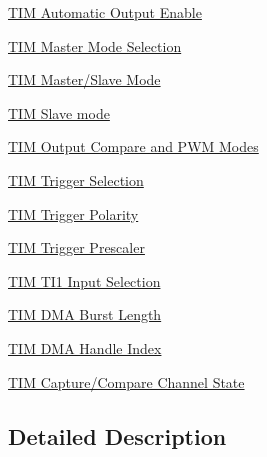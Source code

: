 \begin{DoxyCompactItemize}
\hyperlink{group___t_i_m___a_o_e___bit___set___reset}{T\+I\+M Automatic Output Enable}
\item 
\hyperlink{group___t_i_m___master___mode___selection}{T\+I\+M Master Mode Selection}
\item 
\hyperlink{group___t_i_m___master___slave___mode}{T\+I\+M Master/\+Slave Mode}
\item 
\hyperlink{group___t_i_m___slave___mode}{T\+I\+M Slave mode}
\item 
\hyperlink{group___t_i_m___output___compare__and___p_w_m__modes}{T\+I\+M Output Compare and P\+W\+M Modes}
\item 
\hyperlink{group___t_i_m___trigger___selection}{T\+I\+M Trigger Selection}
\item 
\hyperlink{group___t_i_m___trigger___polarity}{T\+I\+M Trigger Polarity}
\item 
\hyperlink{group___t_i_m___trigger___prescaler}{T\+I\+M Trigger Prescaler}
\item 
\hyperlink{group___t_i_m___t_i1___selection}{T\+I\+M T\+I1 Input Selection}
\item 
\hyperlink{group___t_i_m___d_m_a___burst___length}{T\+I\+M D\+M\+A Burst Length}
\item 
\hyperlink{group___d_m_a___handle__index}{T\+I\+M D\+M\+A Handle Index}
\item 
\hyperlink{group___channel___c_c___state}{T\+I\+M Capture/\+Compare Channel State}
\end{DoxyCompactItemize}


\subsection{Detailed Description}
